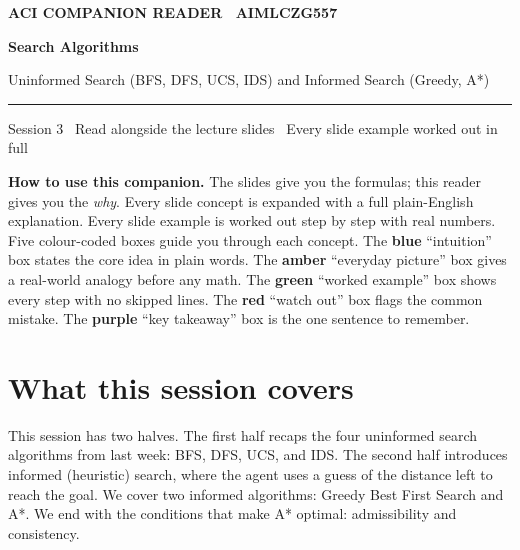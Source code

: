 \documentclass[a4paper,11pt]{article}
\providecommand{\addfontfeatureslike}[1]{#1}
\newcommand{\titlebanner}[4]{%
  \begin{tcolorbox}[
    enhanced, breakable=false,
    colback=navy, colframe=navy,
    boxrule=0pt, arc=3pt, outer arc=3pt,
    left=16pt, right=16pt, top=16pt, bottom=16pt,
    before skip=2pt, after skip=14pt,
    width=\linewidth ]
    {\sffamily\footnotesize\bfseries\color{white!85}%
      \MakeUppercase{\addfontfeatureslike{#1}}}\par
    \vspace{6pt}
    {\sffamily\bfseries\fontsize{30}{34}\selectfont\color{white} #2\par}
    \vspace{5pt}
    {\sffamily\large\color{white!88} #3\par}
    \vspace{9pt}
    {\color{white!55}\rule{\linewidth}{0.4pt}}\par
    \vspace{6pt}
    {\sffamily\footnotesize\color{white!82} #4\par}
  \end{tcolorbox}%
}
\begin{document}
\thispagestyle{fancy}

\titlebanner
  {ACI Companion Reader \textperiodcentered\ AIMLCZG557}
  {Search Algorithms}
  {Uninformed Search (BFS, DFS, UCS, IDS) and Informed Search (Greedy, A*)}
  {Session 3 \textperiodcentered\ Read alongside the lecture slides \textperiodcentered\ Every slide example worked out in full}

\noindent\textbf{How to use this companion.}
The slides give you the formulas; this reader gives you the \emph{why}. Every
slide concept is expanded with a full plain-English explanation. Every slide
example is worked out step by step with real numbers. Five colour-coded boxes
guide you through each concept. The \textcolor{intuFrame}{\textbf{blue}}
``intuition'' box states the core idea in plain words. The
\textcolor{everyFrame}{\textbf{amber}} ``everyday picture'' box gives a
real-world analogy before any math. The
\textcolor{workFrame}{\textbf{green}} ``worked example'' box shows every
step with no skipped lines. The \textcolor{watchFrame}{\textbf{red}}
``watch out'' box flags the common mistake. The
\textcolor{keyFrame}{\textbf{purple}} ``key takeaway'' box is the one
sentence to remember.

\medskip

\section{What this session covers}

This session has two halves. The first half recaps the four uninformed
search algorithms from last week: BFS, DFS, UCS, and IDS. The second half
introduces informed (heuristic) search, where the agent uses a guess of
the distance left to reach the goal. We cover two informed algorithms:
Greedy Best First Search and A*. We end with the conditions that make A*
optimal: admissibility and consistency.
\end{document}
